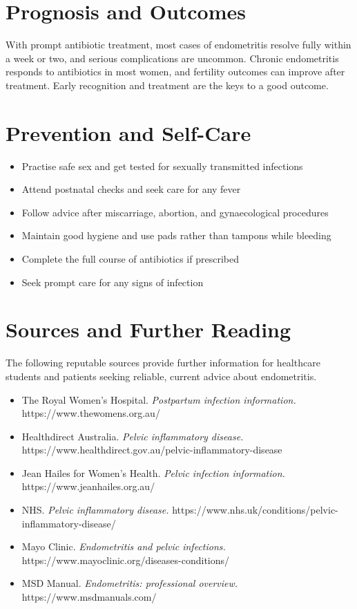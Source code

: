 \section*{Prognosis and Outcomes}
With prompt antibiotic treatment, most cases of endometritis resolve fully within a week or two, and serious complications are uncommon. Chronic endometritis responds to antibiotics in most women, and fertility outcomes can improve after treatment. Early recognition and treatment are the keys to a good outcome.

\section*{Prevention and Self-Care}
\begin{itemize}
    \item Practise safe sex and get tested for sexually transmitted infections
    \item Attend postnatal checks and seek care for any fever
    \item Follow advice after miscarriage, abortion, and gynaecological procedures
    \item Maintain good hygiene and use pads rather than tampons while bleeding
    \item Complete the full course of antibiotics if prescribed
    \item Seek prompt care for any signs of infection
\end{itemize}

\section*{Sources and Further Reading}
The following reputable sources provide further information for healthcare students and patients seeking reliable, current advice about endometritis.
\begin{itemize}
    \item The Royal Women's Hospital. \textit{Postpartum infection information.} https://www.thewomens.org.au/
    \item Healthdirect Australia. \textit{Pelvic inflammatory disease.} https://www.healthdirect.gov.au/pelvic-inflammatory-disease
    \item Jean Hailes for Women's Health. \textit{Pelvic infection information.} https://www.jeanhailes.org.au/
    \item NHS. \textit{Pelvic inflammatory disease.} https://www.nhs.uk/conditions/pelvic-inflammatory-disease/
    \item Mayo Clinic. \textit{Endometritis and pelvic infections.} https://www.mayoclinic.org/diseases-conditions/
    \item MSD Manual. \textit{Endometritis: professional overview.} https://www.msdmanuals.com/
\end{itemize}
